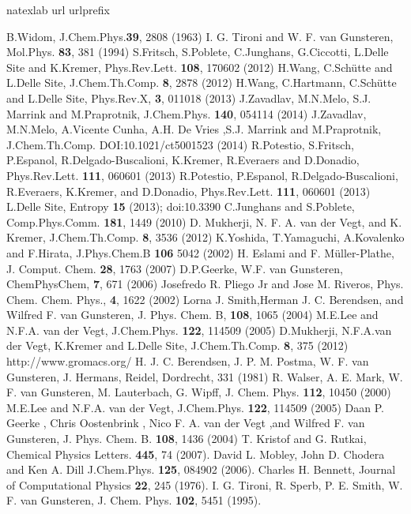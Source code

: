 \documentclass[a4paper,preprint,unsortedaddress]{revtex4-1}
\begin{document}
\begin{thebibliography}{24}
\expandafter\ifx\csname natexlab\endcsname\relax\def\natexlab#1{#1}\fi
\expandafter\ifx\csname url\endcsname\relax
  \def\url#1{\texttt{#1}}\fi
\expandafter\ifx\csname urlprefix\endcsname\relax\def\urlprefix{URL }\fi

B.Widom, J.Chem.Phys.{\bf 39}, 2808 (1963)
I. G. Tironi and W. F. van Gunsteren, Mol.Phys. {\bf 83}, 381 (1994)
S.Fritsch, S.Poblete, C.Junghans, G.Ciccotti, L.Delle Site and K.Kremer, Phys.Rev.Lett. {\bf 108}, 170602 (2012)
H.Wang, C.Sch\"{u}tte and L.Delle Site, J.Chem.Th.Comp. {\bf 8}, 2878 (2012)
H.Wang, C.Hartmann, C.Sch\"{u}tte and L.Delle Site, Phys.Rev.X, {\bf 3}, 011018 (2013)
J.Zavadlav, M.N.Melo, S.J. Marrink and M.Praprotnik, J.Chem.Phys. {\bf 140}, 054114 (2014)
J.Zavadlav, M.N.Melo, A.Vicente Cunha, A.H. De Vries ,S.J. Marrink and M.Praprotnik, J.Chem.Th.Comp. DOI:10.1021/ct5001523 (2014)
R.Potestio, S.Fritsch, P.Espanol, R.Delgado-Buscalioni, K.Kremer, R.Everaers and D.Donadio, Phys.Rev.Lett. {\bf 111}, 060601 (2013)
R.Potestio, P.Espanol, R.Delgado-Buscalioni, R.Everaers, K.Kremer, and D.Donadio, Phys.Rev.Lett. {\bf 111}, 060601 (2013)
L.Delle Site, Entropy {\bf 15} (2013); doi:10.3390
C.Junghans and S.Poblete, Comp.Phys.Comm. {\bf 181}, 1449 (2010)
D. Mukherji, N. F. A. van der Vegt, and K. Kremer, J.Chem.Th.Comp. {\bf 8}, 3536 (2012)
K.Yoshida, T.Yamaguchi, A.Kovalenko and F.Hirata, J.Phys.Chem.B {\bf 106} 5042 (2002)
H. Eslami and F. M\"{u}ller-Plathe, J. Comput. Chem. {\bf 28}, 1763 (2007)
D.P.Geerke, W.F. van Gunsteren, ChemPhysChem, {\bf 7}, 671 (2006)
Josefredo R. Pliego Jr and Jose  M. Riveros, Phys. Chem. Chem. Phys., {\bf 4}, 1622 (2002)
Lorna J. Smith,Herman J. C. Berendsen, and Wilfred F. van Gunsteren, J. Phys. Chem. B, {\bf 108}, 1065 (2004)
M.E.Lee and N.F.A. van der Vegt, J.Chem.Phys. {\bf 122}, 114509 (2005)
D.Mukherji, N.F.A.van der Vegt, K.Kremer and L.Delle Site, J.Chem.Th.Comp. {\bf 8}, 375 (2012)
http://www.gromacs.org/
H. J. C. Berendsen, J. P. M. Postma, W. F. van Gunsteren, J. Hermans, Reidel, Dordrecht, 331 (1981)
R. Walser, A. E. Mark, W. F. van Gunsteren, M. Lauterbach, G. Wipff, J. Chem. Phys. {\bf 112}, 10450 (2000)
M.E.Lee and N.F.A. van der Vegt, J.Chem.Phys. {\bf 122}, 114509 (2005)
Daan P. Geerke , Chris Oostenbrink , Nico F. A. van der Vegt ,and Wilfred F. van Gunsteren, J. Phys. Chem. B. {\bf 108}, 1436 (2004)
T. Kristof and G. Rutkai, Chemical Physics Letters. {\bf 445}, 74 (2007). 
David L. Mobley, John D. Chodera and Ken A. Dill  J.Chem.Phys. {\bf 125}, 084902 (2006).
Charles H. Bennett, Journal of Computational Physics {\bf 22}, 245 (1976).
I. G. Tironi, R. Sperb, P. E. Smith, W. F. van Gunsteren, J. Chem. Phys. {\bf 102}, 5451 (1995).
\end{thebibliography}
\end{document}
